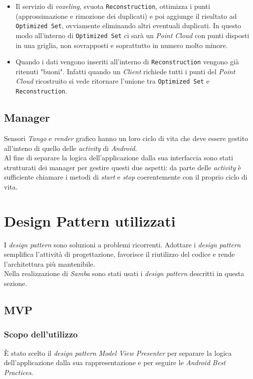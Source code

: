 \begin{itemize}
	\item Il servizio di \emph{voxeling}, svuota \texttt{Reconstruction}, ottimizza i punti (approssimazione e rimozione dei duplicati) e poi aggiunge il risultato ad \texttt{Optimized Set}, ovviamente eliminando altri eventuali duplicati. In questo modo all'interno di \texttt{Optimized Set} ci sarà un \emph{Point Cloud} con punti disposti in una griglia, non sovrapposti e soprattutto in numero molto minore.
	\item Quando i dati vengono inseriti all'interno di \texttt{Reconstruction} vengono già ritenuti "buoni". Infatti quando un \emph{Client} richiede tutti i punti del \emph{Point Cloud} ricostruito si vede ritornare l'unione tra \texttt{Optimized Set} e   \texttt{Reconstruction}.
\end{itemize}

\subsection{Manager}
Sensori \emph{Tango} e \emph{render} grafico hanno un loro ciclo di vita che deve essere gestito all'inteno di quello delle \emph{activity} di \emph{Android}.\\
Al fine di separare la logica dell'applicazione dalla sua interfaccia sono stati strutturati dei manager per gestire questi due aspetti: da parte delle \emph{activity} è sufficiente chiamare i metodi di \emph{start} e \emph{stop} coerentemente con il proprio ciclo di vita.\\

\newpage
\section{Design Pattern utilizzati}
I \emph{design pattern} sono soluzioni a problemi ricorrenti. Adottare i \emph{design pattern} semplifica
l'attività di progettazione, favorisce il riutilizzo del codice e rende l'architettura
più mantenibile.\\
Nella realizzazione di \emph{Samba} sono stati usati i \emph{design pattern} descritti in questa sezione.

\subsection{MVP}
\subsubsection{Scopo dell'utilizzo}
È stato scelto il \emph{design pattern} \emph{Model View Presenter} per separare la logica dell'applicazione dalla sua rappresentazione e per seguire le \emph{Android Best Practices}.
